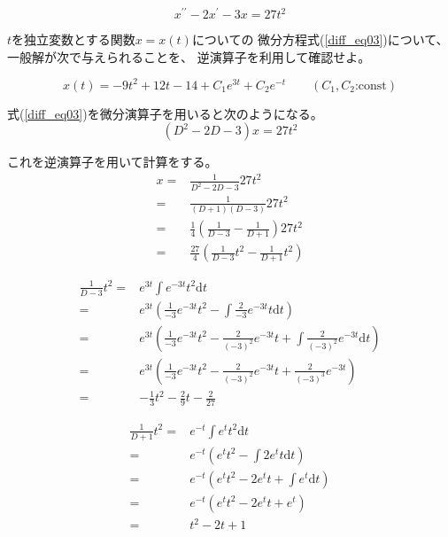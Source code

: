\documentclass[12pt,b5paper]{ltjsarticle}
\begin{document}
\hrulefill



\begin{equation}
 x^{\prime\prime}- 2x^{\prime}-3x=27t^2
  \label{diff_eq03}
\end{equation}

$t$を独立変数とする関数$x=x(t)$についての
微分方程式(\ref{diff_eq03})について、
一般解が次で与えられることを、
逆演算子を利用して確認せよ。

\begin{equation}
 x(t)=-9t^2+12t-14+C_1e^{3t}+C_2e^{-t}
  \qquad
  (C_1,C_2\text{:const})
\end{equation}

\dotfill

式(\ref{diff_eq03})を微分演算子を用いると次のようになる。
\begin{equation}
 (D^2-2D-3)x=27t^2
\end{equation}

これを逆演算子を用いて計算をする。
\begin{align}
 x =& \frac{1}{D^2-2D-3}27t^2\\
 =& \frac{1}{(D+1)(D-3)}27t^2\\
 =& \frac{1}{4}\left( \frac{1}{D-3}-\frac{1}{D+1} \right) 27t^2\\
 =& \frac{27}{4}\left( \frac{1}{D-3}t^2-\frac{1}{D+1}t^2 \right)
\end{align}

\begin{align}
 \frac{1}{D-3}t^2
  =& e^{3t} \int e^{-3t}t^2\mathrm{d}t\\
  =& e^{3t} \left( \frac{1}{-3}e^{-3t}t^2 - \int \frac{2}{-3}e^{-3t}t\mathrm{d}t \right)\\
  =& e^{3t} \left( \frac{1}{-3}e^{-3t}t^2 - \frac{2}{(-3)^2}e^{-3t}t + \int \frac{2}{(-3)^2}e^{-3t}\mathrm{d}t \right)\\
  =& e^{3t} \left( \frac{1}{-3}e^{-3t}t^2 - \frac{2}{(-3)^2}e^{-3t}t + \frac{2}{(-3)^3} e^{-3t} \right)\\
  =& -\frac{1}{3} t^2 - \frac{2}{9}t - \frac{2}{27}
\end{align}

\begin{align}
 \frac{1}{D+1}t^2
 =& e^{-t} \int e^{t} t^2 \mathrm{d}t\\
 =& e^{-t} \left( e^{t} t^2 - \int 2 e^{t} t \mathrm{d}t \right)\\
 =& e^{-t} \left( e^{t} t^2 - 2 e^{t} t + \int e^{t} \mathrm{d}t \right)\\
 =& e^{-t} \left( e^{t} t^2 - 2 e^{t} t + e^{t} \right)\\
 =& t^2 - 2 t + 1
\end{align}
\end{document}

